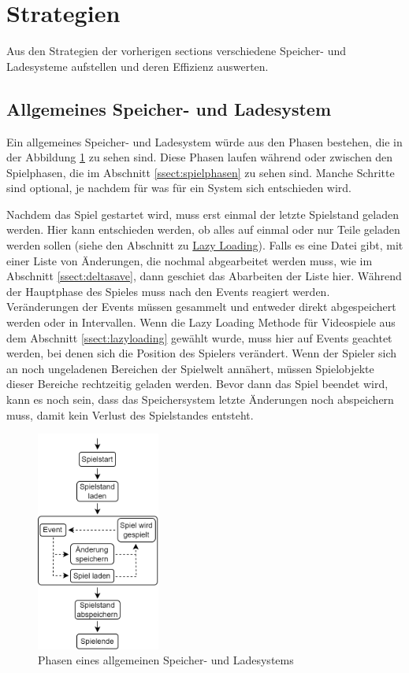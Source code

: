\section{Strategien}
Aus den Strategien der vorherigen sections verschiedene Speicher- und Ladesysteme aufstellen und deren Effizienz auswerten. 

\subsection{Allgemeines Speicher- und Ladesystem}
Ein allgemeines Speicher- und Ladesystem würde aus den Phasen bestehen, die in der Abbildung \ref{fig:speicherphasen} zu sehen sind. Diese Phasen laufen während oder zwischen den Spielphasen, die im Abschnitt \ref{ssect:spielphasen} zu sehen sind. Manche Schritte sind optional, je nachdem für was für ein System sich entschieden wird.

Nachdem das Spiel gestartet wird, muss erst einmal der letzte Spielstand geladen werden. Hier kann entschieden werden, ob alles auf einmal oder nur Teile geladen werden sollen (siehe den Abschnitt zu \hyperref[ssect:lazyloading]{Lazy Loading}). Falls es eine Datei gibt, mit einer Liste von Änderungen, die nochmal abgearbeitet werden muss, wie im Abschnitt \ref{ssect:deltasave}, dann geschiet das Abarbeiten der Liste hier. Während der Hauptphase des Spieles muss nach den Events reagiert werden. Veränderungen der Events müssen gesammelt und entweder direkt abgespeichert werden oder in Intervallen. Wenn die Lazy Loading Methode für Videospiele aus dem Abschnitt \ref{ssect:lazyloading} gewählt wurde, muss hier auf Events geachtet werden, bei denen sich die Position des Spielers verändert. Wenn der Spieler sich an noch ungeladenen Bereichen der Spielwelt annähert, müssen Spielobjekte dieser Bereiche rechtzeitig geladen werden. Bevor dann das Spiel beendet wird, kann es noch sein, dass das Speichersystem letzte Änderungen noch abspeichern muss, damit kein Verlust des Spielstandes entsteht.

\begin{figure}[htp]
    \centering
    \includegraphics[width=0.36\textwidth]{images/Speichersystem.png}
    \caption{Phasen eines allgemeinen Speicher- und Ladesystems}
    \label{fig:speicherphasen}
\end{figure}

